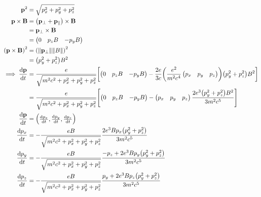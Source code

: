 \documentclass{report}
\begin{document}
\begin{align*}
        \vb{p}^2 &= \sqrt{p_x^2 + p_y^2 + p_z^2}\\
        \vb{p} \times \vb{B} &= \pqty{\vb{p}_{\perp} + \vb{p}_{\parallel}} \times \vb{B}\\
        &= \vb{p}_{\perp} \times \vb{B}\\
        &= \pmqty{0 & p_z B & - p_y B}\\
        \pqty{\vb{p} \times \vb{B}}^2 &= \pqty{\norm{\vb{p}_{\perp}} \norm{B}}^2\\
        &= \pqty{p_y^2 + p_z^2} B^2\\
        \implies \dv{\vb{p}}{t} &= \frac{e}{\sqrt{m^2 c^2 + p_x^2 + p_y^2 + p_z^2}} \bqty{\pmqty{0 & p_z B & - p_y B} - \frac{2 e}{3 c} \pqty{\frac{e^2}{m^2 c^4} \pmqty{p_x & p_y & p_z}} \pqty{p_y^2 + p_z^2} B^2}\\
        &= \frac{e}{\sqrt{m^2 c^2 + p_x^2 + p_y^2 + p_z^2}} \bqty{\pmqty{0 & p_z B & - p_y B} - \pmqty{p_x & p_y & p_z} \frac{2 e^3 \pqty{p_y^2 + p_z^2} B^2}{3 m^2 c^5}}\\
        \dv{\vb{p}}{t} &= \pmqty{\dv{p_x}{t}, \dv{p_y}{t}, \dv{p_z}{t}}\\
        \dv{p_x}{t} &= - \frac{e B}{\sqrt{m^2 c^2 + p_x^2 + p_y^2 + p_z^2}} \frac{2 e^3 B p_x \pqty{p_y^2 + p_z^2}}{3 m^2 c^5}\\
        \dv{p_y}{t} &= - \frac{e B}{\sqrt{m^2 c^2 + p_x^2 + p_y^2 + p_z^2}} \frac{- p_z + 2 e^3 B p_y \pqty{p_y^2 + p_z^2}}{3 m^2 c^5}\\
        \dv{p_z}{t} &= - \frac{e B}{\sqrt{m^2 c^2 + p_x^2 + p_y^2 + p_z^2}} \frac{p_y + 2 e^3 B p_z \pqty{p_y^2 + p_z^2}}{3 m^2 c^5}\\
    \end{align*}
\end{document}
